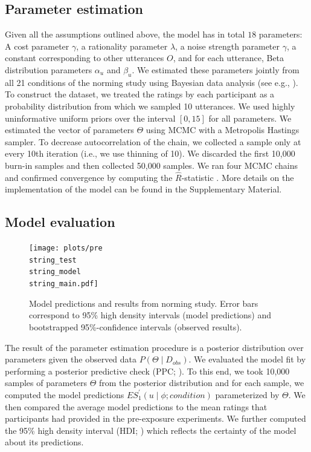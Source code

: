 \documentclass[lucida,biblatex]{sp} %
\begin{document}
\subsection{Parameter estimation}

Given all the assumptions outlined above, the model has in total $18$ parameters: A cost parameter $\gamma$, a rationality parameter $\lambda$, a noise strength parameter $\gamma$, a constant corresponding to other utterances $O$, and for each utterance, Beta distribution parameters $\alpha_u$ and $\beta_u$. We estimated these parameters jointly from all 21 conditions of the norming study using Bayesian data analysis (see e.g., \cite{Kruschke2014}). To construct the dataset, we treated the ratings by each participant as a probability distribution from which we sampled 10 utterances. We used highly uninformative
uniform priors over the interval $[0,15]$ for all parameters. We estimated the vector of parameters $\Theta$ using MCMC with a Metropolis Hastings sampler. To decrease autocorrelation of the chain, we collected a sample only at every 10th iteration (i.e., we use thinning of 10). We discarded the first 10,000 burn-in samples and then collected 50,000 samples.  We ran four MCMC chains and confirmed convergence by computing the $\hat{R}$-statistic \citep{Gelman1992}. More details on the implementation of the model can be found in the Supplementary Material.

\subsection{Model evaluation}



\begin{figure}
\texttt{[image: plots/pre\\string\_test\\string\_model\\string\_main.pdf]}
\caption{Model predictions and results from norming study. Error bars correspond to 95\% high density intervals (model predictions) and bootstrapped 95\%-confidence intervals (observed results). \label{fig:norming-results-model-main}}

\end{figure}


The result of the parameter estimation procedure is a posterior distribution over parameters given the observed data $P(\Theta \mid D_{obs})$. We evaluated
the model fit by performing a posterior predictive check (PPC; \cite{Kruschke2014}). To this end, we took 10,000 samples of parameters $\Theta$ from the posterior distribution
and for each sample, we computed the model predictions $ES_{1}^'(u \mid \phi; condition)$ parameterized by $\Theta$. We then compared the average model predictions to the
mean ratings that participants had provided in the pre-exposure experiments. We further computed the 95\% high density interval (HDI; \cite{Kruschke2014}) which reflects the certainty of the model
about its predictions.
\end{document}
